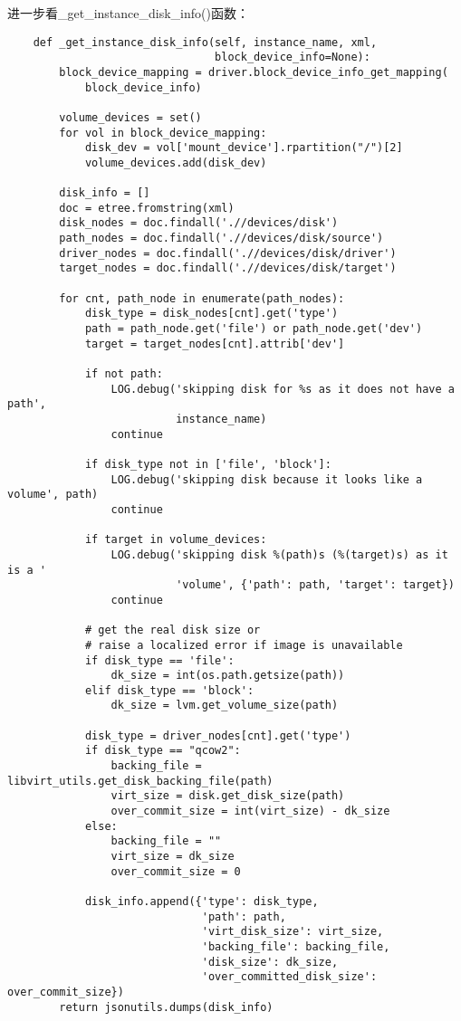 \documentclass[a4paper,left=1.5cm,right=1.5cm,11pt]{article}
\begin{document}
	进一步看\_get\_instance\_disk\_info()函数：
	\begin{lstlisting}
	def _get_instance_disk_info(self, instance_name, xml,
                                block_device_info=None):
        block_device_mapping = driver.block_device_info_get_mapping(
            block_device_info)

        volume_devices = set()
        for vol in block_device_mapping:
            disk_dev = vol['mount_device'].rpartition("/")[2]
            volume_devices.add(disk_dev)

        disk_info = []
        doc = etree.fromstring(xml)
        disk_nodes = doc.findall('.//devices/disk')
        path_nodes = doc.findall('.//devices/disk/source')
        driver_nodes = doc.findall('.//devices/disk/driver')
        target_nodes = doc.findall('.//devices/disk/target')

        for cnt, path_node in enumerate(path_nodes):
            disk_type = disk_nodes[cnt].get('type')
            path = path_node.get('file') or path_node.get('dev')
            target = target_nodes[cnt].attrib['dev']

            if not path:
                LOG.debug('skipping disk for %s as it does not have a path',
                          instance_name)
                continue

            if disk_type not in ['file', 'block']:
                LOG.debug('skipping disk because it looks like a volume', path)
                continue

            if target in volume_devices:
                LOG.debug('skipping disk %(path)s (%(target)s) as it is a '
                          'volume', {'path': path, 'target': target})
                continue

            # get the real disk size or
            # raise a localized error if image is unavailable
            if disk_type == 'file':
                dk_size = int(os.path.getsize(path))
            elif disk_type == 'block':
                dk_size = lvm.get_volume_size(path)

            disk_type = driver_nodes[cnt].get('type')
            if disk_type == "qcow2":
                backing_file = libvirt_utils.get_disk_backing_file(path)
                virt_size = disk.get_disk_size(path)
                over_commit_size = int(virt_size) - dk_size
            else:
                backing_file = ""
                virt_size = dk_size
                over_commit_size = 0

            disk_info.append({'type': disk_type,
                              'path': path,
                              'virt_disk_size': virt_size,
                              'backing_file': backing_file,
                              'disk_size': dk_size,
                              'over_committed_disk_size': over_commit_size})
        return jsonutils.dumps(disk_info)
	\end{lstlisting}
\end{document}
